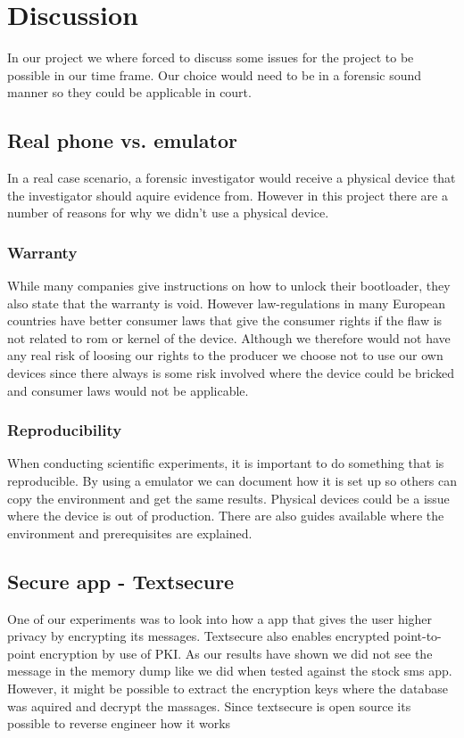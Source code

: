 \section{Discussion}
In our project we where forced to discuss some issues for the project to be 
possible in our time frame. Our choice would need to be in a forensic sound manner 
so they could be applicable in court. 
\subsection{Real phone vs. emulator}
In a real case scenario, a forensic investigator would receive a physical device 
that the investigator should aquire evidence from. However in this project there 
are a number of reasons for why we didn't use a physical device.
\subsubsection{Warranty}
While many companies give instructions on how to unlock their bootloader, they also 
state that the warranty is void. However law-regulations in many European countries 
have better consumer laws that give the consumer rights if the flaw %
is not related to rom or kernel of the device. Although we therefore would not have 
any real risk of loosing our rights to the producer we choose not to use our own 
devices since there always is some risk involved where the device could be bricked 
and consumer laws would not be applicable.
\subsubsection{Reproducibility}
When conducting scientific experiments, it is important to do something that is 
reproducible. By using a emulator we can document how it is set up so others can 
copy the environment and get the same results. Physical devices could be a issue 
where the device is out of production. There are also guides available where the environment and prerequisites are explained.

\subsection{Secure app - Textsecure}
One of our experiments was to look into how a app that gives the user higher 
privacy by encrypting its messages. Textsecure also enables encrypted point-to-
point encryption by use of PKI. As our results have shown we did not see the 
message in the memory dump like we did when tested against the stock sms app. 
However, it might be possible to extract the encryption keys where the database was 
aquired and decrypt the massages. Since textsecure is open source its possible to 
reverse engineer how it works %
